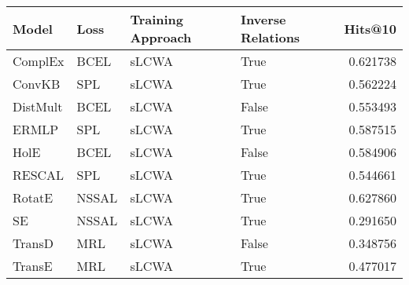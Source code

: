 \begin{tabular}{llllr}
\toprule
    Model &   Loss & Training Approach & Inverse Relations &   Hits@10 \\
\midrule
  ComplEx &   BCEL &             sLCWA &              True &  0.621738 \\
   ConvKB &    SPL &             sLCWA &              True &  0.562224 \\
 DistMult &   BCEL &             sLCWA &             False &  0.553493 \\
    ERMLP &    SPL &             sLCWA &              True &  0.587515 \\
     HolE &   BCEL &             sLCWA &             False &  0.584906 \\
   RESCAL &    SPL &             sLCWA &              True &  0.544661 \\
   RotatE &  NSSAL &             sLCWA &              True &  0.627860 \\
       SE &  NSSAL &             sLCWA &              True &  0.291650 \\
   TransD &    MRL &             sLCWA &             False &  0.348756 \\
   TransE &    MRL &             sLCWA &              True &  0.477017 \\
\bottomrule
\end{tabular}

